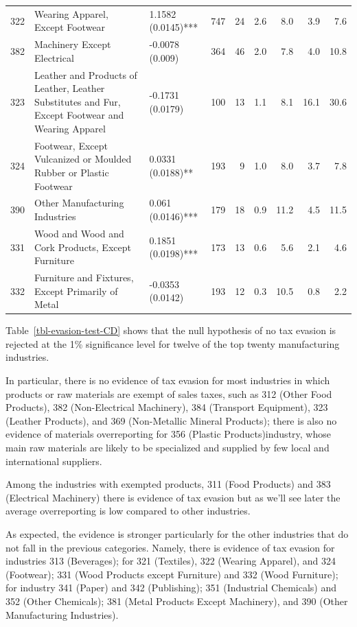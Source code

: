 \documentclass[
  12pt]{article}
\theoremstyle{definition}
\theoremstyle{remark}
\begin{document}
\begin{table}
{\begin{tabular}[t]{l|l|l|r|r|r|r|r|r}
\cline{1-9}
322 & Wearing Apparel, Except Footwear & 1.1582 (0.0145)*** & 747 & 24 & 2.6 & 8.0 & 3.9 & 7.6\\
\cline{1-9}
382 & Machinery Except Electrical & -0.0078 (0.009) & 364 & 46 & 2.0 & 7.8 & 4.0 & 10.8\\
\cline{1-9}
323 & Leather and Products of Leather, Leather Substitutes and Fur, Except Footwear and Wearing Apparel & -0.1731 (0.0179) & 100 & 13 & 1.1 & 8.1 & 16.1 & 30.6\\
\cline{1-9}
324 & Footwear, Except Vulcanized or Moulded Rubber or Plastic Footwear & 0.0331 (0.0188)** & 193 & 9 & 1.0 & 8.0 & 3.7 & 7.8\\
\cline{1-9}
390 & Other Manufacturing Industries & 0.061 (0.0146)*** & 179 & 18 & 0.9 & 11.2 & 4.5 & 11.5\\
\cline{1-9}
331 & Wood and Wood and Cork Products, Except Furniture & 0.1851 (0.0198)*** & 173 & 13 & 0.6 & 5.6 & 2.1 & 4.6\\
\cline{1-9}
332 & Furniture and Fixtures, Except Primarily of Metal & -0.0353 (0.0142) & 193 & 12 & 0.3 & 10.5 & 0.8 & 2.2\\
\hline
\end{tabular}

}

\end{table}%

Table~\ref{tbl-evasion-test-CD} shows that the null hypothesis of no tax
evasion is rejected at the 1\% significance level for twelve of the top
twenty manufacturing industries.

In particular, there is no evidence of tax evasion for most industries
in which products or raw materials are exempt of sales taxes, such as
312 (Other Food Products), 382 (Non-Electrical Machinery), 384
(Transport Equipment), 323 (Leather Products), and 369 (Non-Metallic
Mineral Products); there is also no evidence of materials overreporting
for 356 (Plastic Products)industry, whose main raw materials are likely
to be specialized and supplied by few local and international suppliers.

Among the industries with exempted products, 311 (Food Products) and 383
(Electrical Machinery) there is evidence of tax evasion but as we'll see
later the average overreporting is low compared to other industries.

As expected, the evidence is stronger particularly for the other
industries that do not fall in the previous categories. Namely, there is
evidence of tax evasion for industries 313 (Beverages); for 321
(Textiles), 322 (Wearing Apparel), and 324 (Footwear); 331 (Wood
Products except Furniture) and 332 (Wood Furniture); for industry 341
(Paper) and 342 (Publishing); 351 (Industrial Chemicals) and 352 (Other
Chemicals); 381 (Metal Products Except Machinery), and 390 (Other
Manufacturing Industries).
\end{document}
